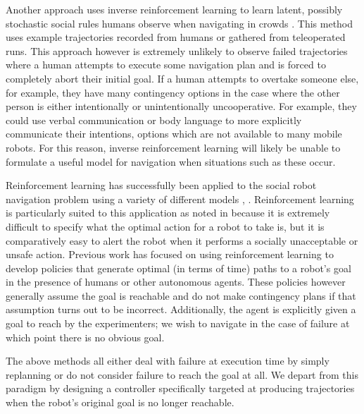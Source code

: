 \documentclass[letterpaper, 10 pt, conference]{ieeeconf}  %
\begin{document}
	Another approach uses inverse reinforcement learning to learn latent, possibly stochastic social rules humans observe when navigating in crowds \cite{socialirl}. This method uses example trajectories recorded from humans or gathered from teleoperated runs. This approach however is extremely unlikely to observe failed trajectories where a human attempts to execute some navigation plan and is forced to completely abort their initial goal. If a human attempts to overtake someone else, for example, they have many contingency options in the case where the other person is either intentionally or unintentionally uncooperative. For example, they could use verbal communication or body language to more explicitly communicate their intentions, options which are not available to many mobile robots. For this reason, inverse reinforcement learning will likely be unable to formulate a useful model for navigation when situations such as these occur.
	
	Reinforcement learning has successfully been applied to the social robot navigation problem using a variety of different models \cite{sociallyawarerl}, \cite{crowdawarerl}. Reinforcement learning is particularly suited to this application as noted in \cite{sociallyawarerl} because it is extremely difficult to specify what the optimal action for a robot to take is, but it is comparatively easy to alert the robot when it performs a socially unacceptable or unsafe action. Previous work has focused on using reinforcement learning to develop policies that generate optimal (in terms of time) paths to a robot's goal in the presence of humans or other autonomous agents. These policies however generally assume the goal is reachable and do not make contingency plans if that assumption turns out to be incorrect. Additionally, the agent is explicitly given a goal to reach by the experimenters; we wish to navigate in the case of failure at which point there is no obvious goal.
	
	The above methods all either deal with failure at execution time by simply replanning or do not consider failure to reach the goal at all. We depart from this paradigm by designing a controller specifically targeted at producing trajectories when the robot's original goal is no longer reachable.
	
\end{document}

